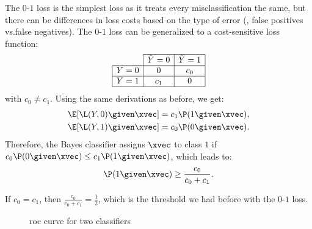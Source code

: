 The $0$-$1$ loss is the simplest loss as it treats every misclassification the same, but there can be differences in loss costs based on the type of error (\eg, false positives vs.\@ false negatives). The $0$-$1$ loss can be generalized to a cost-sensitive loss function:
\begin{equation}
    \begin{array}{|c|c|c|}
        \cline{2-3}
        \multicolumn{1}{c|}{} & \hat{Y} = 0 & \hat{Y} = 1 \\
        \hline
        Y = 0                 & 0           & c_{0}       \\
        \hline
        Y = 1                 & c_{1}       & 0           \\
        \hline
    \end{array}
\end{equation}
with $c_0 \neq c_1$. Using the same derivations as before, we get:
\begin{equation}
    \begin{aligned}
        \E[\L(Y\negthinspace, 0) \given \xvec] & = c_1 \P(1 \given \xvec), \\
        \E[\L(Y\negthinspace, 1) \given \xvec] & = c_0 \P(0 \given \xvec).
    \end{aligned}
\end{equation}
Therefore, the Bayes classifier assigns $\xvec$ to class $1$ if $c_0 \P(0 \given \xvec) \leq c_1 \P(1 \given \xvec)$, which leads to:
\begin{equation}
    \P(1\given \xvec) \geq \frac{c_0}{c_0 + c_1}.
\end{equation}

\begin{observation}
    If $c_0 = c_1$, then $\frac{c_0}{c_0 + c_1} = \frac{1}{2}$, which is the threshold we had before with the $0$-$1$ loss.
\end{observation}

\begin{figure}
    \centering
    \caption{\acs{roc} curve for two classifiers}\label{fig:roc}
\end{figure}

